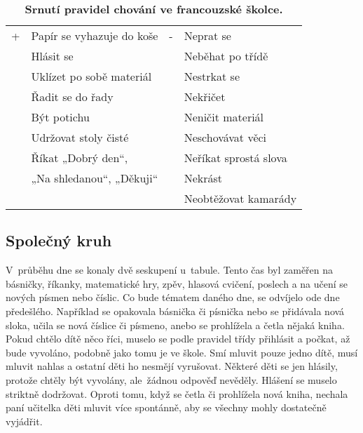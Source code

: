 			\begin{spacing}{1.0}
			\begin{table}[h!]
				\center
				\begin{tabular}{|ll|ll|}
					\hline
					\rowcolor{grey!0}
				+	& Papír se vyhazuje do koše						& -	& Neprat se 			\\
					& Hlásit se 									&  	& Neběhat po třídě		\\
					& Uklízet po sobě materiál 						&	& Nestrkat se 			\\
					& Řadit se do řady 								&	& Nekřičet 				\\
					& Být potichu 									& 	& Neničit materiál 		\\
					& Udržovat stoly čisté 							& 	& Neschovávat věci 		\\
					& Říkat „Dobrý den“,							&	& Neříkat sprostá slova \\
					&  „Na shledanou“, „Děkuji“						&	& Nekrást				\\
					&												&	& Neobtěžovat kamarády 	\\
					\hline
				\end{tabular}
				\caption{ \textbf{Srnutí pravidel chování ve francouzské školce.}}
			\label{tab:pravidlaFR}
			\end{table}
			\end{spacing}

			\subsection{Společný kruh}
			V průběhu dne se konaly dvě seskupení u~tabule. Tento čas byl zaměřen na básničky, říkanky, matematické hry, zpěv, hlasová cvičení, poslech a na učení se nových písmen nebo číslic. Co bude tématem daného dne, se odvíjelo ode dne předešlého. Například se opakovala básnička či písnička nebo se přidávala nová sloka, učila se nová číslice či písmeno, anebo se prohlížela a četla nějaká kniha. Pokud chtělo dítě něco říci, muselo se podle pravidel třídy přihlásit a počkat, až bude vyvoláno, podobně jako tomu je ve škole. Smí mluvit pouze jedno dítě, musí mluvit nahlas a ostatní děti ho nesmějí vyrušovat. Některé děti se jen hlásily, protože chtěly být vyvolány, ale žádnou odpověď nevěděly. Hlášení se muselo striktně dodržovat. Oproti tomu, když se četla či prohlížela nová kniha, nechala paní učitelka děti mluvit více spontánně, aby se všechny mohly dostatečně vyjádřit.

